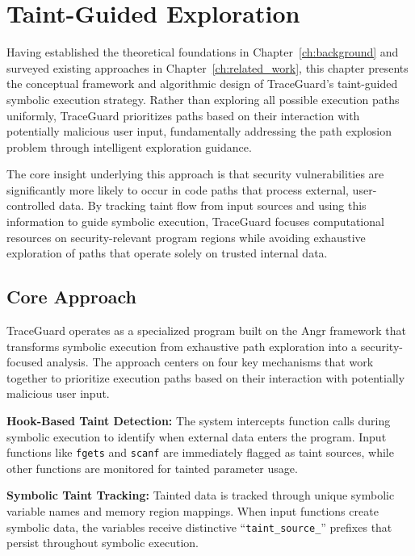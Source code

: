 \chapter{Taint-Guided Exploration}\label{ch:taint_guided_exploration}

Having established the theoretical foundations in Chapter~\ref{ch:background} and surveyed existing approaches in Chapter~\ref{ch:related_work}, this chapter presents the conceptual framework and algorithmic design of TraceGuard's taint-guided symbolic execution strategy. Rather than exploring all possible execution paths uniformly, TraceGuard prioritizes paths based on their interaction with potentially malicious user input, fundamentally addressing the path explosion problem through intelligent exploration guidance.

The core insight underlying this approach is that security vulnerabilities are significantly more likely to occur in code paths that process external, user-controlled data. By tracking taint flow from input sources and using this information to guide symbolic execution, TraceGuard focuses computational resources on security-relevant program regions while avoiding exhaustive exploration of paths that operate solely on trusted internal data.

\section{Core Approach}

TraceGuard operates as a specialized program built on the Angr framework that transforms symbolic execution from exhaustive path exploration into a security-focused analysis. The approach centers on four key mechanisms that work together to prioritize execution paths based on their interaction with potentially malicious user input.

\textbf{Hook-Based Taint Detection:} The system intercepts function calls during symbolic execution to identify when external data enters the program. Input functions like \texttt{fgets} and \texttt{scanf} are immediately flagged as taint sources, while other functions are monitored for tainted parameter usage.

\textbf{Symbolic Taint Tracking:} Tainted data is tracked through unique symbolic variable names and memory region mappings. When input functions create symbolic data, the variables receive distinctive ``\texttt{taint\_source\_}'' prefixes that persist throughout symbolic execution.

